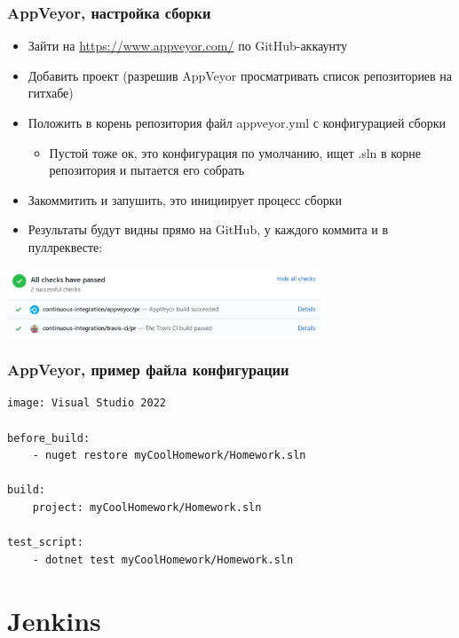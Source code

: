\documentclass{../../slides-style}
\begin{document}
    \begin{frame}
        \frametitle{AppVeyor, настройка сборки}
        \begin{itemize}
            \item Зайти на \url{https://www.appveyor.com/} по GitHub-аккаунту
            \item Добавить проект (разрешив AppVeyor просматривать список репозиториев на гитхабе)
            \item Положить в корень репозитория файл appveyor.yml с конфигурацией сборки
            \begin{itemize}
                \item Пустой тоже ок, это конфигурация по умолчанию, ищет .sln в корне репозитория и пытается его собрать
            \end{itemize}
            \item Закоммитить и запушить, это инициирует процесс сборки
            \item Результаты будут видны прямо на GitHub, у каждого коммита и в пуллреквесте:
        \end{itemize}
        \begin{center}
            \includegraphics[width=0.7\textwidth]{appVeyorSuccess.png}
        \end{center}
    \end{frame}

    \begin{frame}[fragile]
        \frametitle{AppVeyor, пример файла конфигурации}
        \begin{verbatim}
image: Visual Studio 2022

before_build: 
    - nuget restore myCoolHomework/Homework.sln

build: 
    project: myCoolHomework/Homework.sln

test_script: 
    - dotnet test myCoolHomework/Homework.sln
        \end{verbatim}
    \end{frame}

    \section{Jenkins}
\end{document}
